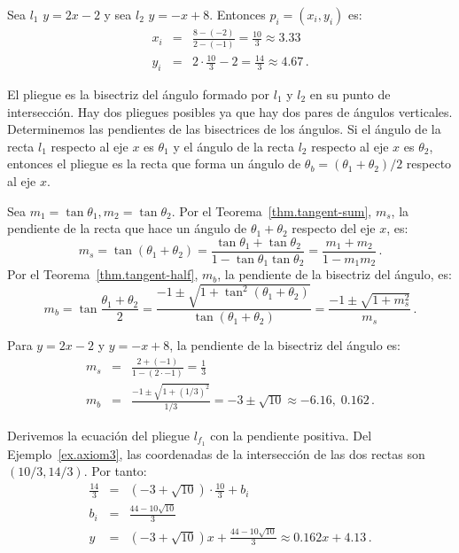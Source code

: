\begin{example}\label{ex.axiom3}
Sea $l_1$ $y=2x-2$ y sea $l_2$ $y=-x+8$. Entonces $p_i=(x_i,y_i)$ es:
\begin{eqnarray*}
x_i&=&\frac{8-(-2)}{2-(-1)}=\frac{10}{3}\approx 3.33\\
y_i &=& 2\cdot\frac{10}{3}-2=\frac{14}{3}\approx 4.67\,.
\end{eqnarray*}
\end{example}

El pliegue es la bisectriz del ángulo formado por $l_1$ y $l_2$ en su punto de intersección. Hay dos pliegues posibles ya que hay dos pares de ángulos verticales. Determinemos las pendientes de las bisectrices de los ángulos. Si el ángulo de la recta $l_1$ respecto al eje $x$ es $\theta_1$ y el ángulo de la recta $l_2$ respecto al eje $x$ es $\theta_2$, entonces el pliegue es la recta que forma un ángulo de $\theta_b=(\theta_1+\theta_2)/2$ respecto al eje $x$.

Sea $m_1=\tan \theta_1, m_2=\tan \theta_2$. Por el Teorema~\ref{thm.tangent-sum}, $m_s$, la pendiente de la recta que hace un ángulo de $\theta_1+\theta_2$ respecto del eje $x$, es:
\[
m_s=\tan(\theta_1+\theta_2)= \frac{\tan\theta_1+\tan\theta_2}{1-\tan\theta_1\tan\theta_2}=\frac{m_1+m_2}{1-m_1m_2}\,.
\]
Por el Teorema~\ref{thm.tangent-half}, $m_b$, la pendiente de la bisectriz del ángulo, es:
\[
m_b= \tan\frac{\theta_1+\theta_2}{2}=\frac{-1\pm\sqrt{1+\tan^2(\theta_1+\theta_2)}}{\tan (\theta_1+\theta_2)}=\frac{-1\pm\sqrt{1+m_s^2}}{m_s}\,.
\]
\begin{example}
Para $y=2x-2$ y $y=-x+8$, la pendiente de la bisectriz del ángulo es:
\begin{eqnarray*}
m_s&=&\frac{2+(-1)}{1-(2 \cdot -1)}=\frac{1}{3}\\
m_b&=&\frac{-1\pm\sqrt{1+(1/3)^2}}{1/3}=-3\pm \sqrt{10}\approx -6.16,\; 0.162\,.
\end{eqnarray*}
\end{example}

Derivemos la ecuación del pliegue $l_{f_1}$ con la pendiente positiva. Del Ejemplo~\ref{ex.axiom3}, las coordenadas de la intersección de las dos rectas son $(10/3, 14/3)$. Por tanto:
\begin{eqnarray*}
\frac{14}{3} &=& (-3+\sqrt{10}) \cdot \frac{10}{3} + b_i\\ b_i&=&\frac{44-10\sqrt{10}}{3}\\
y&=& (-3+\sqrt{10})x + \frac{44-10\sqrt{10}}{3}\approx 0.162x+4.13\,.
\end{eqnarray*}

